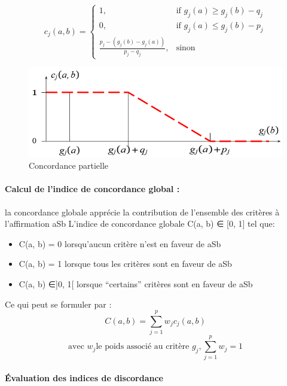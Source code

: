 \[
    c_{j}(a, b)= 
\begin{cases}
    1 ,& \text{if } g_{j}(a) \geq g_{j}(b) - q_{j}\\
    0 ,& \text{if } g_{j}(a) \leq g_{j}(b) - p_{j}\\
    \frac{p_{j} - (g_{j}(b)-g_{j}(a))}{p_{j} - q_{j}}  ,              & \text{sinon}
\end{cases}
\]

\begin{figure}[!h]
\begin{center}
\includegraphics{aide_multicrit_decision/conc_partielle.png}
\end{center}
\caption{Concordance partielle}
\end{figure}

\paragraph{Calcul de l’indice de concordance global :}
la concordance globale apprécie la contribution de l’ensemble des critères à l’affirmation aSb
L’indice de concordance globale C(a, b) ∈ [0, 1]  tel que:
\begin{itemize}
\item C(a, b) = 0 lorsqu’aucun critère n’est en faveur de aSb
\item C(a, b) = 1 lorsque tous les critères sont en faveur de aSb
\item C(a, b) ∈]0, 1[ lorsque “certains” critères sont en faveur de aSb
\end{itemize}

Ce qui peut se formuler par :\\
\[
C(a, b) = \sum_{j=1}^{p}w_{j}c_{j}(a, b)
\]
\[\text{avec } w_{j}  \text{le poids associé au critère  } g_{j},  \sum_{j=1}^{p}w_{j} = 1\]

\paragraph{Évaluation des indices de discordance }


